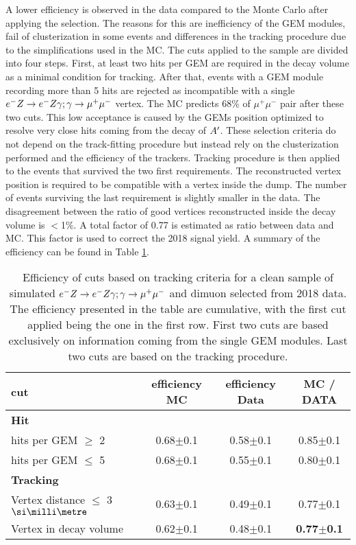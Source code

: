 A lower efficiency is observed in the data compared to the Monte Carlo after applying the selection. The reasons for this are inefficiency of the GEM modules, fail of clusterization in some events and differences in the tracking procedure due to the simplifications used in the MC. The cuts applied to the sample are divided into four steps. First, at least two hits per GEM are required in the decay volume as a minimal condition for tracking. After that, events with a GEM module recording more than 5 hits are rejected as incompatible with a single $e^- Z \to e^- Z \gamma; \gamma \to \mu^+ \mu^-$ vertex. The MC predicts 68\% of $\mu^+ \mu^-$ pair after these two cuts. This low acceptance is caused by the GEMs position optimized to resolve very close hits coming from the decay of $A'$. These selection criteria do not depend on the track-fitting procedure but instead rely on the clusterization performed and the efficiency of the trackers. Tracking procedure is then applied to the events that survived the two first requirements. The reconstructed vertex position is required to be compatible with a vertex inside the dump. The number of events surviving the last requirement  is slightly smaller in the data. The disagreement between the ratio of good vertices reconstructed inside the decay volume is $<$1\%. A total factor of 0.77 is estimated as ratio between data and MC. This factor is used to correct the 2018 signal yield. A summary of the efficiency can be found in Table \ref{tab:dimuon:efficiencies}.

\begin{center}
\begin{table}
  \begin{tabular}{|l|c|c|c|}
    \hline
    cut & efficiency MC & efficiency Data & MC / DATA \\
    \hline
    \multicolumn{4}{|l|}{\textbf{Hit}}\\
    \hline
    hits per GEM $\geq$ 2 & 0.68$\pm$0.1 & 0.58$\pm$0.1 & 0.85$\pm$0.1 \\
    hits per GEM $\leq$ 5 & 0.68$\pm$0.1 & 0.55$\pm$0.1 & 0.80$\pm$0.1 \\
    \hline
    \multicolumn{4}{|l|}{\textbf{Tracking}}\\    
    \hline
    Vertex distance $\leq$ 3 $\mmi$ & 0.63$\pm$0.1 & 0.49$\pm$0.1 & 0.77$\pm$0.1  \\
    Vertex in decay volume & 0.62$\pm$0.1 & 0.48$\pm$0.1 & \textbf{0.77$\pm$0.1}\\
    \hline
    
  \end{tabular}
  \caption[MC/DATA for the tracking procedure and vertex reconstruction]{Efficiency of cuts based on tracking criteria for a clean sample of simulated $e^- Z \to e^- Z \gamma; \gamma \to \mu^+ \mu^-$ and dimuon selected from 2018 data. The efficiency presented in the table are cumulative, with the first cut applied being the one in the first row. First two cuts are based exclusively on information coming from the single GEM modules. Last two cuts are based on the tracking procedure.}
  \label{tab:dimuon:efficiencies}
\end{table}
\end{center}

